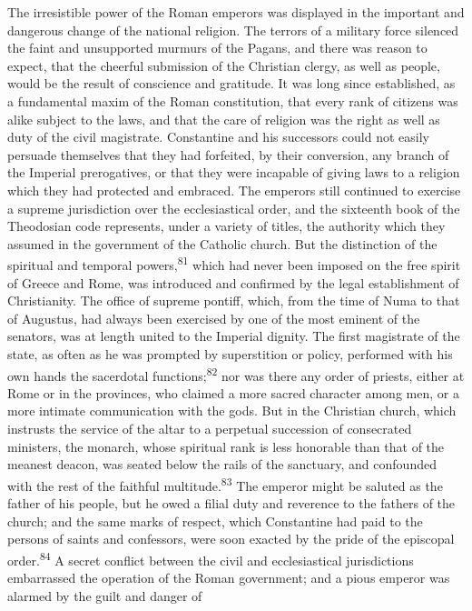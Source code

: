 The irresistible power of the Roman emperors was displayed in the
important and dangerous change of the national religion. The terrors of
a military force silenced the faint and unsupported murmurs of the
Pagans, and there was reason to expect, that the cheerful submission of
the Christian clergy, as well as people, would be the result of
conscience and gratitude. It was long since established, as a
fundamental maxim of the Roman constitution, that every rank of
citizens was alike subject to the laws, and that the care of religion
was the right as well as duty of the civil magistrate. Constantine and
his successors could not easily persuade themselves that they had
forfeited, by their conversion, any branch of the Imperial
prerogatives, or that they were incapable of giving laws to a religion
which they had protected and embraced. The emperors still continued to
exercise a supreme jurisdiction over the ecclesiastical order, and the
sixteenth book of the Theodosian code represents, under a variety of
titles, the authority which they assumed in the government of the
Catholic church. But the distinction of the spiritual and temporal
powers,\textsuperscript{81} which had never been imposed on the free spirit of Greece
and Rome, was introduced and confirmed by the legal establishment of
Christianity. The office of supreme pontiff, which, from the time of
Numa to that of Augustus, had always been exercised by one of the most
eminent of the senators, was at length united to the Imperial dignity.
The first magistrate of the state, as often as he was prompted by
superstition or policy, performed with his own hands the sacerdotal
functions;\textsuperscript{82} nor was there any order of priests, either at Rome or in
the provinces, who claimed a more sacred character among men, or a more
intimate communication with the gods. But in the Christian church,
which instrusts the service of the altar to a perpetual succession of
consecrated ministers, the monarch, whose spiritual rank is less
honorable than that of the meanest deacon, was seated below the rails
of the sanctuary, and confounded with the rest of the faithful
multitude.\textsuperscript{83} The emperor might be saluted as the father of his people,
but he owed a filial duty and reverence to the fathers of the church;
and the same marks of respect, which Constantine had paid to the
persons of saints and confessors, were soon exacted by the pride of the
episcopal order.\textsuperscript{84} A secret conflict between the civil and
ecclesiastical jurisdictions embarrassed the operation of the Roman
government; and a pious emperor was alarmed by the guilt and danger of
